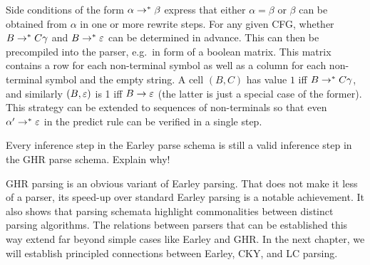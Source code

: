 Side conditions of the form $\alpha \rightarrow^* \beta$ express that either $\alpha = \beta$ or $\beta$ can be obtained from $\alpha$ in one or more rewrite steps.
For any given CFG, whether $B \rightarrow^* C \gamma$ and $B \rightarrow^* \varepsilon$ can be determined in advance.
This can then be precompiled into the parser, e.g.\ in form of a boolean matrix.
This matrix contains a row for each non-terminal symbol as well as a column for each non-terminal symbol and the empty string.
A cell $(B,C)$ has value $1$ iff $B \rightarrow^* C \gamma$, and similarly $(B,\varepsilon)$ is 1 iff $B \rightarrow \varepsilon$ (the latter is just a special case of the former).
This strategy can be extended to sequences of non-terminals so that even $\alpha' \rightarrow^* \varepsilon$ in the predict rule can be verified in a single step.

\begin{exercise}
    Every inference step in the Earley parse schema is still a valid inference step in the GHR parse schema.
    Explain why!
\end{exercise}

GHR parsing is an obvious variant of Earley parsing.
That does not make it less of a parser, its speed-up over standard Earley parsing is a notable achievement.
It also shows that parsing schemata highlight commonalities between distinct parsing algorithms.
The relations between parsers that can be established this way extend far beyond simple cases like Earley and GHR\@.
In the next chapter, we will establish principled connections between Earley, CKY, and LC parsing.



